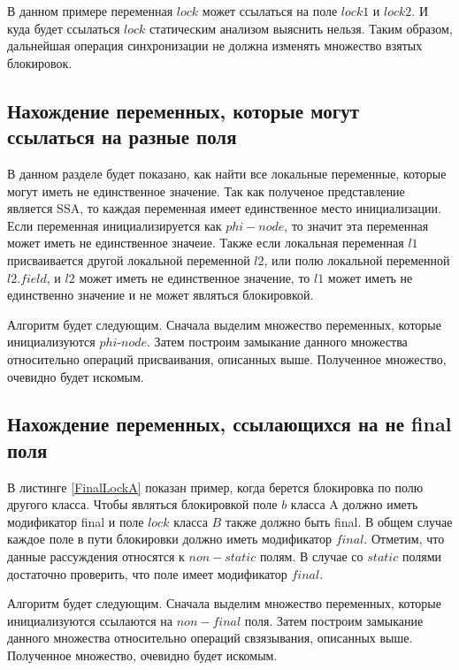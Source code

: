 

В данном примере переменная $lock$ может ссылаться на поле $lock1$ и $lock2$. И куда будет ссылаться $lock$ статическим анализом выяснить нельзя. Таким образом, дальнейшая операция  синхронизации не должна изменять множество взятых блокировок.

\subsection{Нахождение переменных, которые могут ссылаться на разные поля}
В данном разделе будет показано, как найти все локальные переменные, которые могут иметь не единственное значение.
Так как полученое представление является SSA, то каждая переменная имеет единственное место инициализации. 
Если переменная инициализируется как $phi-node$, то значит эта переменная может иметь не единственное значеие. Также если локальная переменная $l1$ присваивается другой локальной переменной $l2$, или полю локальной переменной $l2.field$, и $l2$ может иметь не единственное значение, то $l1$ может иметь не единственно значение и не может являться блокировкой.

Алгоритм будет следующим. Сначала выделим множество переменных, которые инициализуются $phi$-$node$. Затем построим замыкание данного множества относительно операций присваивания, описанных выше. Полученное множество, очевидно будет искомым.

\subsection{Нахождение переменных, ссылающихся на не final поля}


В листинге \ref{FinalLockA} показан пример, когда берется блокировка по полю другого класса. 
Чтобы являться блокировкой поле $b$ класса A должно иметь модификатор final и поле $lock$ класса $B$ также должно быть final. В общем случае каждое поле в пути блокировки должно иметь модификатор $final$. Отметим, что данные рассуждения относятся к $non-static$ полям. В случае со $static$ полями достаточно проверить, что поле имеет модификатор $final$.

Алгоритм будет следующим. Сначала выделим множество переменных, которые инициализуются ссылаются на $non-final$ поля. Затем построим замыкание данного множества относительно операций свзязывания, описанных выше. Полученное множество, очевидно будет искомым.

